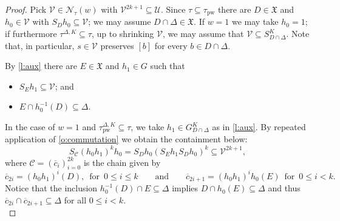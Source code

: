 \documentclass{article}
\theoremstyle{remark}
\theoremstyle{definition}
\newcommand{\U}[0]{\mathbb{U}}
\newcommand{\nn}[0]{S}%
\renewcommand{\U}[0]{\mathcal{U}}
\newcommand{\V}[0]{\mathcal{V}}
\newcommand{\pw}[0]{\tau_{\mathrm{pw}}}
\newcommand{\C}[0]{\mathcal{C}}
\newcommand{\X}[0]{\mathfrak{X}}
\renewcommand\leq{\leqslant}
\begin{document}
{{{{{\begin{proof}
 Pick $\V \in \mathcal{N}_\tau(w)$ with $\V^{2k+1} \subseteq \U$. Since $\tau \subseteq \pw$
  there are $D \in \X$ and $h_0 \in \V$ with $\nn_D h_0 \subseteq \V$; we may assume
  $D \cap \Delta \in \X$.
  If $w = 1$ we may take $h_0 = 1$; if furthermore $\tau^{\Delta, K} \subseteq \tau$,
  {up to shrinking $\V$, we may assume that $\V\subseteq S^{K}_{D\cap\Delta}$. Note that, in particular, $s \in \V$ preserves $[b]$ for every $b\in D \cap \Delta$.}
   	  
   	  
   	  By \cref{l:aux} there are $E\in\X$ and $h_{1}\in G$ such that 
      \begin{itemize}
   	     \item {$\nn_{E}h_{1}\subseteq\V$; and}
   	     \item $E\cap h_{0}^{-1}(D)\subseteq \Delta$.
      \end{itemize}
   {In the case of $w=1$ and $\pw^{\Delta, K}\subseteq\tau$, we take $h_1\in G^K_{D\cap\Delta}$ as in \cref{l:aux}.}
     By repeated application of \cref{o:commutation} we obtain the {containment}
     below: 
      \begin{equation*}
   	   \nn_{\C}(h_{0}h_{1})^{k}h_{0}=\nn_{D}h_{0}(\nn_{E}h_{1}\nn_{D}h_{0})^{k}\subseteq\V^{2k+1},
      \end{equation*}
      where $\C=(\overline{c}_{i})_{i=0}^{2k}$ is the chain given by
      \begin{equation*}
         \overline{c}_{2i}=(h_{0}h_{1})^{i}(D),\, \text{ for }\,0\leq i\leq k\quad\quad \text{and} \quad\quad \overline{c}_{2i+1}=(h_{0}h_{1})^{i}h_{0}(E)\, \text{ for }\, 0\leq i< k.
      \end{equation*} 
      Notice that the inclusion $h_{0}^{-1}(D)\cap E\subseteq\Delta$ implies
      $D\cap h_{0}(E)\subseteq\Delta$ and thus $\overline{c}_{2i}\cap \overline{c}_{2i+1}\subseteq\Delta$ for all %
       {$0\leq i< k$}.\\
      

\end{proof}}}}}}
\end{document}
